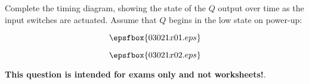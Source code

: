 

Complete the timing diagram, showing the state of the $Q$ output over time as the input switches are actuated.  Assume that $Q$ begins in the low state on power-up:

$$\epsfbox{03021x01.eps}$$







$$\epsfbox{03021x02.eps}$$







{\bf This question is intended for exams only and not worksheets!}.




